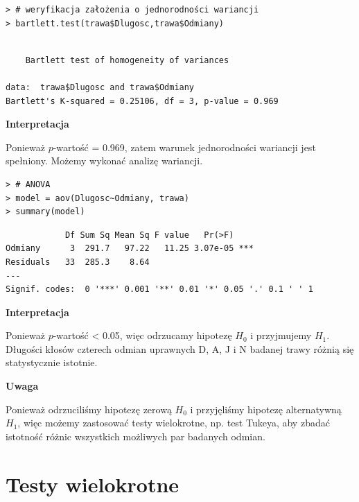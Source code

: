 \documentclass[12pt,B5paper,]{book}
\begin{document}
\vspace{0.8cm}

\begin{verbatim}
> # weryfikacja założenia o jednorodności wariancji
> bartlett.test(trawa$Dlugosc,trawa$Odmiany)
\end{verbatim}

\begin{verbatim}

    Bartlett test of homogeneity of variances

data:  trawa$Dlugosc and trawa$Odmiany
Bartlett's K-squared = 0.25106, df = 3, p-value = 0.969
\end{verbatim}

\vspace{0.8cm} \textbf{Interpretacja}

Ponieważ \(p\)-wartość = 0.969, zatem warunek jednorodności wariancji
jest spełniony. Możemy wykonać analizę wariancji.

\vspace{0.8cm}

\begin{verbatim}
> # ANOVA
> model = aov(Dlugosc~Odmiany, trawa)
> summary(model)
\end{verbatim}

\begin{verbatim}
            Df Sum Sq Mean Sq F value   Pr(>F)    
Odmiany      3  291.7   97.22   11.25 3.07e-05 ***
Residuals   33  285.3    8.64                     
---
Signif. codes:  0 '***' 0.001 '**' 0.01 '*' 0.05 '.' 0.1 ' ' 1
\end{verbatim}

\vspace{0.8cm} \textbf{Interpretacja}

Ponieważ \(p\)-wartość \textless{} 0.05, więc odrzucamy hipotezę \(H_0\)
i przyjmujemy \(H_1\). Długości kłosów czterech odmian uprawnych D, A, J
i N badanej trawy różnią się statystycznie istotnie.

\newpage

\textbf{Uwaga}

Ponieważ odrzuciliśmy hipotezę zerową \(H_0\) i przyjęliśmy hipotezę
alternatywną \(H_1\), więc możemy zastosować testy wielokrotne, np. test
Tukeya, aby zbadać istotność różnic wszystkich możliwych par badanych
odmian.

\section{Testy wielokrotne}\label{testy-wielokrotne}
\end{document}
